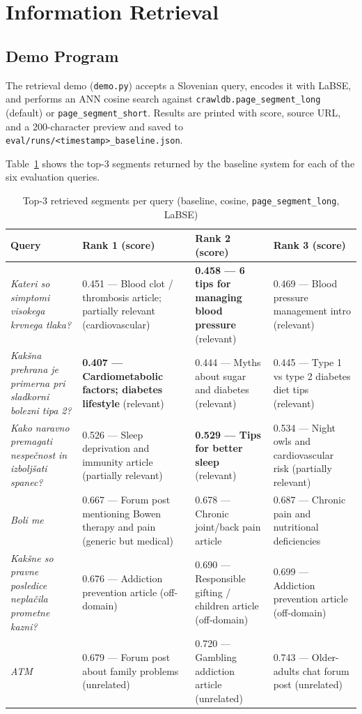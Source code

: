 \documentclass[9pt]{IEEEtran}
\begin{document}
\section{Information Retrieval}
\subsection{Demo Program}
The retrieval demo (\texttt{demo.py}) accepts a Slovenian query, encodes it with LaBSE, and performs an ANN cosine search against \texttt{crawldb.page\_segment\_long} (default) or \texttt{page\_segment\_short}.
Results are printed with score, source URL, and a 200-character preview and saved to \texttt{eval/runs/<timestamp>\_baseline.json}.

Table~\ref{tab:queries} shows the top-3 segments returned by the baseline system for each of the six evaluation queries.

\begin{table}[t]
\centering
\small
\caption{Top-3 retrieved segments per query (baseline, cosine, \texttt{page\_segment\_long}, LaBSE)}
\label{tab:queries}
\begin{tabular}{p{2.6cm}p{3.4cm}p{3.4cm}p{3.4cm}}
\hline
\textbf{Query} & \textbf{Rank 1 (score)} & \textbf{Rank 2 (score)} & \textbf{Rank 3 (score)} \\
\hline
\textit{Kateri so simptomi visokega krvnega tlaka?} &
  0.451 — Blood clot / thrombosis article; partially relevant (cardiovascular) &
  \textbf{0.458 — 6 tips for managing blood pressure} (relevant) &
  0.469 — Blood pressure management intro (relevant) \\
\hline
\textit{Kakšna prehrana je primerna pri sladkorni bolezni tipa 2?} &
  \textbf{0.407 — Cardiometabolic factors; diabetes lifestyle} (relevant) &
  0.444 — Myths about sugar and diabetes (relevant) &
  0.445 — Type 1 vs type 2 diabetes diet tips (relevant) \\
\hline
\textit{Kako naravno premagati nespečnost in izboljšati spanec?} &
  0.526 — Sleep deprivation and immunity article (partially relevant) &
  \textbf{0.529 — Tips for better sleep} (relevant) &
  0.534 — Night owls and cardiovascular risk (partially relevant) \\
\hline
\textit{Boli me} &
  0.667 — Forum post mentioning Bowen therapy and pain (generic but medical) &
  0.678 — Chronic joint/back pain article &
  0.687 — Chronic pain and nutritional deficiencies \\
\hline
\textit{Kakšne so pravne posledice neplačila prometne kazni?} &
  0.676 — Addiction prevention article (off-domain) &
  0.690 — Responsible gifting / children article (off-domain) &
  0.699 — Addiction prevention article (off-domain) \\
\hline
\textit{ATM} &
  0.679 — Forum post about family problems (unrelated) &
  0.720 — Gambling addiction article (unrelated) &
  0.743 — Older-adults chat forum post (unrelated) \\
\hline
\end{tabular}
\end{table}
\end{document}
